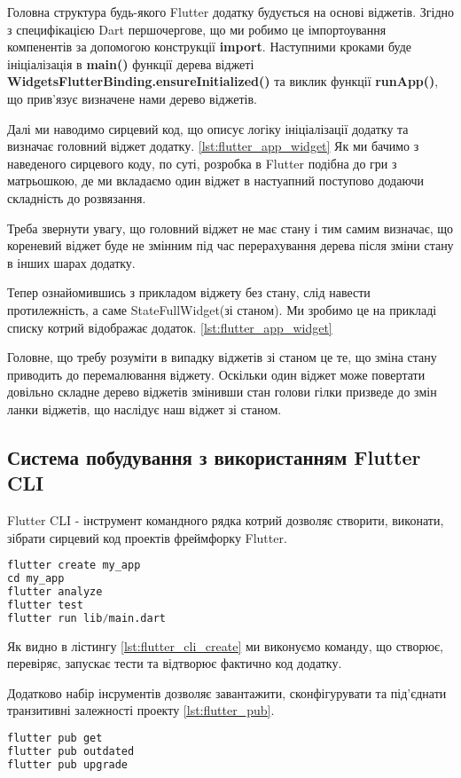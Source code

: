 Головна структура будь-якого Flutter додатку будується на основі віджетів.
Згідно з специфікацією Dart першочергове, що ми робимо це імпортоування компенентів за допомогою конструкції \textbf{import}.
Наступними кроками буде ініціалізація в \textbf{main()} функції дерева віджеті \textbf{WidgetsFlutterBinding.ensureInitialized()} та
виклик функції \textbf{runApp()}, що прив'язує визначене нами дерево віджетів.

Далі ми наводимо сирцевий код, що описує логіку ініціалізації додатку та визначає головний віджет додатку. \ref{lst:flutter_app_widget}
Як ми бачимо з наведеного сирцевого коду, по суті, розробка в Flutter подібна до гри з матрьошкою,
де ми вкладаємо один віджет в настуапний поступово додаючи складність до розвязання.

Треба звернути увагу, що головний віджет не має стану і тим самим визначає, що кореневий віджет буде не змінним
під час перерахування дерева після зміни стану в інших шарах додатку.

Тепер ознайомившись з прикладом віджету без стану, слід навести протилежність, а саме StateFullWidget(зі станом).
Ми зробимо це на прикладі списку котрий відображає додаток. \ref{lst:flutter_app_widget}

Головне, що требу розуміти в випадку віджетів зі станом це те, що зміна стану приводить до перемалювання віджету.
Оскільки один віджет може повертати довільно складне дерево віджетів змінивши стан голови гілки призведе до змін
ланки віджетів, що наслідує наш віджет зі станом.

\subsection{Система побудування з використанням Flutter CLI}
\label{subsec:flutter_cli_theory}
Flutter CLI - інструмент командного рядка котрий дозволяє створити, виконати, зібрати сирцевий код проектів фреймфорку Flutter.

\begin{lstlisting}[style=light, language=Python,label={lst:flutter_cli_create},caption=Flutter Create Project]
flutter create my_app
cd my_app
flutter analyze
flutter test
flutter run lib/main.dart
\end{lstlisting}

Як видно в лістингу \ref{lst:flutter_cli_create} ми виконуємо команду, що створює, перевіряє, запускає тести та відтворює фактично код додатку.

Додатково набір інсрументів дозволяє завантажити, сконфігурувати та під'єднати транзитивні залежності проекту \ref{lst:flutter_pub}.
\begin{lstlisting}[style=light, language=Python,label={lst:flutter_pub},caption=Flutter Dependency Resolution]
flutter pub get
flutter pub outdated
flutter pub upgrade
\end{lstlisting}

